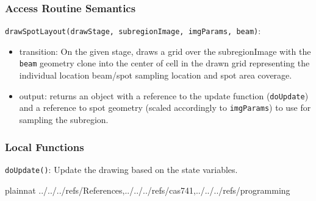 \documentclass[12pt, titlepage]{article}
\newcommand{\code}[1]{\texttt{#1}}
\begin{document}
\subsubsection{Access Routine Semantics}

\noindent \code{drawSpotLayout(drawStage, subregionImage, imgParams, beam)}:
\begin{itemize}
\item transition: On the given stage, draws a grid over the subregionImage with
  the \code{beam} geometry clone into the center of cell in the drawn grid
  representing the individual location beam/spot sampling location and spot area coverage.
\item output: returns an object with a reference to the update function (\code{doUpdate})
  and a reference to spot geometry (scaled accordingly to \code{imgParams})
  to use for sampling the subregion.
\end{itemize}

\subsubsection{Local Functions}
\code{doUpdate()}: Update the drawing based on the state variables.

\newpage








 {plainnat}
 {../../../refs/References,../../../refs/cas741,../../../refs/programming}

\newpage
\end{document}
